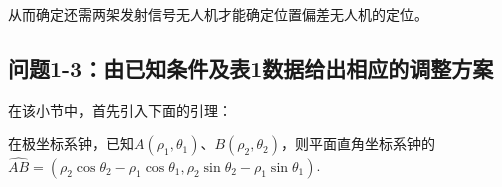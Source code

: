 从而确定还需两架发射信号无人机才能确定位置偏差无人机的定位。


\subsection{问题1-3：由已知条件及表1数据给出相应的调整方案}

在该小节中，首先引入下面的引理：

\begin{theorem}
    在极坐标系钟，已知$A(\rho_1, \theta_1)$、$B(\rho_2, \theta_2)$，则平面直角坐标系钟的$\widehat{AB}=(\rho_2\cos\theta_2 - \rho_1\cos\theta_1, \rho_2\sin\theta_2 - \rho_1\sin\theta_1)$.
\end{theorem}

